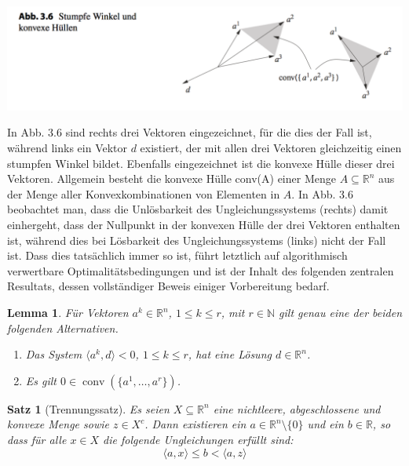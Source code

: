 \documentclass[11pt]{scrreprt}
\newcounter{thm}
\theoremstyle{thmstyle}
\numberwithin{thm}{section}
\newtheorem{lemma}[thm]{Lemma}
\newtheorem{satz}[thm]{Satz}
\begin{document}
\begin{center}
	\includegraphics[scale=0.5]{ab36}
\end{center} 
 
In Abb. 3.6 sind rechts drei Vektoren eingezeichnet, für die dies der Fall ist, während links ein Vektor $d$ existiert, der mit allen drei Vektoren gleichzeitig einen stumpfen Winkel bildet. Ebenfalls eingezeichnet ist die konvexe Hülle dieser drei Vektoren. Allgemein besteht die konvexe Hülle conv(A) einer Menge $A \subseteq \mathbb{R}^n$ aus der Menge aller Konvexkombinationen von Elementen in $A$. In Abb. 3.6 beobachtet man, dass die Unlösbarkeit des Ungleichungssystems (rechts) damit einhergeht, dass der Nullpunkt in der konvexen Hülle der drei Vektoren enthalten ist, während dies bei Lösbarkeit des Ungleichungssystems (links) nicht der Fall ist. Dass dies tatsächlich immer so ist, führt letztlich auf algorithmisch verwertbare Optimalitätsbedingungen und ist der Inhalt des folgenden zentralen Resultats, dessen vollständiger Beweis einiger Vorbereitung bedarf.
 
\begin{lemma}
	Für Vektoren $a^k \in \mathbb{R}^n$, $1 \leq k \leq r$, mit $r \in \mathbb{N}$ gilt genau eine der beiden folgenden Alternativen.
	\begin{enumerate}[label=\alph*\upshape)]
		\item Das System $\langle a^k, d \rangle < 0$, $1 \leq k \leq r$, hat eine Lösung $d \in \mathbb{R}^n$.
		\item Es gilt $0 \in \operatorname{conv}(\{ a^1, \dotsc, a^r \})$.
	\end{enumerate}
\end{lemma} 

\begin{satz}[Trennungssatz] Es seien $X \subseteq \mathbb{R}^n$ eine nichtleere, abgeschlossene und konvexe Menge sowie $z \in X^c$. Dann existieren ein $a \in \mathbb{R}^n \setminus \{ 0 \}$ und ein $b \in \mathbb{R}$, so dass für alle $x \in X$ die folgende Ungleichungen erfüllt sind:
	$$ \langle a, x \rangle \leq b < \langle a, z \rangle $$
\end{satz}
 
\end{document}
